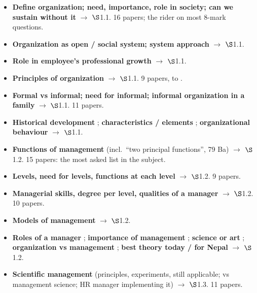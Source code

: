 \begin{itemize}
  \item \textbf{Define organization; need, importance, role in society; can we sustain
    without it} $\rightarrow$ $\S$1.1. 16 papers; the rider on most 8-mark questions.
  \item \textbf{Organization as open / social system; system approach} $\rightarrow$
    $\S$1.1. 
  \item \textbf{Role in employee's professional growth} $\rightarrow$ $\S$1.1.
  \item \textbf{Principles of organization} $\rightarrow$ $\S$1.1. 9 papers,
     to .
  \item \textbf{Formal vs informal; need for informal; informal organization in a family}
    $\rightarrow$ $\S$1.1. 11 papers.
  \item \textbf{Historical development} ; \textbf{characteristics / elements}
    ; \textbf{organizational behaviour}
     $\rightarrow$ $\S$1.1.
  \item \textbf{Functions of management} (incl.\ ``two principal functions'', 79 Ba)
    $\rightarrow$ $\S$1.2. 15 papers: the most asked list in the subject.
  \item \textbf{Levels, need for levels, functions at each level} $\rightarrow$ $\S$1.2.
    9 papers.
  \item \textbf{Managerial skills, degree per level, qualities of a manager} $\rightarrow$
    $\S$1.2. 10 papers.
  \item \textbf{Models of management} $\rightarrow$ $\S$1.2. 
  \item \textbf{Roles of a manager} ; \textbf{importance of management}
    ; \textbf{science or art} ;
    \textbf{organization vs management} ;
    \textbf{best theory today / for Nepal}  $\rightarrow$
    $\S$1.2.
  \item \textbf{Scientific management} (principles, experiments, still applicable; vs
    management science; HR manager implementing it) $\rightarrow$ $\S$1.3. 11 papers.

\end{itemize}
